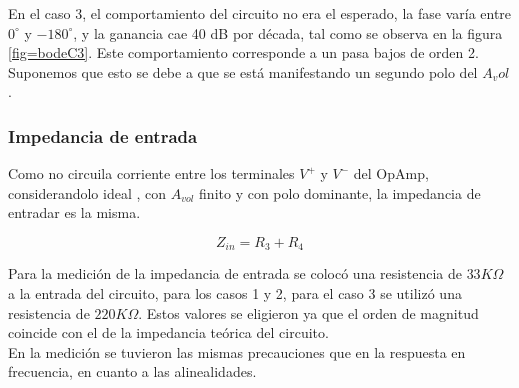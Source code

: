\documentclass[../../main.tex]{subfiles}
\begin{document}
En el caso 3, el comportamiento del circuito no era el esperado, la fase varía entre $0^{\circ}$ y $-180^{\circ}$, y la ganancia cae  40 dB por década, tal como se observa en la figura \ref{fig=bodeC3}. Este comportamiento corresponde a un  pasa bajos de orden 2. Suponemos que esto se debe a que se está manifestando un segundo polo del $A_vol$.

\subsubsection{Impedancia de entrada}

Como no circuila corriente entre los terminales $V^{+}$ y $V^{-}$ del OpAmp, considerandolo ideal , con $A_{vol}$ finito y con polo dominante, la impedancia de entradar es la misma.

\begin{equation}
Z_{in}=R_{3} + R_{4}
\end{equation}

Para la medición de la impedancia de entrada se colocó una resistencia de $33K \Omega $ a la entrada del circuito, para los casos 1 y 2, para el caso 3 se utilizó una resistencia de $220 K\Omega $. Estos valores se eligieron ya que el orden de magnitud coincide con el de la impedancia teórica del circuito.
\\
En la medición se tuvieron las mismas precauciones que en la respuesta en frecuencia, en cuanto a las alinealidades.
\end{document}
